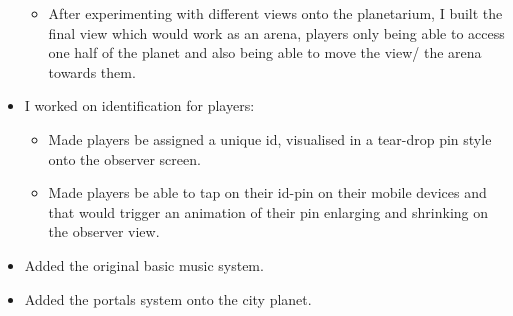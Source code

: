 \documentclass[11pt,a4paper]{article}
\begin{document}
\begin{itemize}
\begin{itemize}
            \item After experimenting with different views onto the planetarium, I built the final view which would work as an arena, players only being able to access one half of the planet and also being able to move the view/ the arena towards them.
          \end{itemize}
          \item I worked on identification for players:
          \begin{itemize}
          \item Made players be assigned a unique id, visualised in a tear-drop pin style onto the observer screen.
          \item Made players be able to tap on their id-pin on their mobile devices and that would trigger an animation of their pin enlarging and shrinking on the observer view.
          \end{itemize}
          \item Added the original basic music system.
          \item Added the portals system onto the city planet.
        \end{itemize}

        \pagebreak
\end{document}
